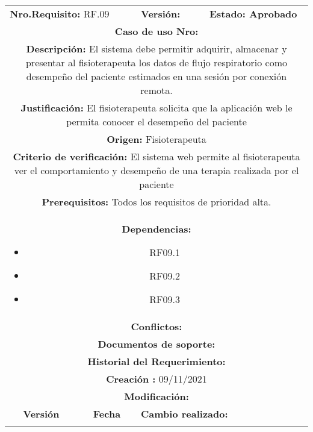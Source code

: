 \begin{center}
\begin{tabular}{|c|c|p{4cm}|p{4cm}|}
            \hline
            \rowcolor{red} \multicolumn{4}{|c|}{\textbf{Prioridad:} Alta}  \\
            \hline
            \multicolumn{2}{|l}{\textbf{Nro.Requisito: }RF.09} & \multicolumn{1}{|l}{\textbf{Versión: }} & \multicolumn{1}{|l|}{\textbf{Estado: Aprobado}} \\
            \multicolumn{4}{|p{13cm}|}{\textbf{Caso de uso Nro: }}  \\
            \hline
            \multicolumn{4}{|p{13cm}|}{\textbf{Descripción: } El sistema debe permitir adquirir, almacenar y presentar al fisioterapeuta los datos de flujo respiratorio como desempeño del paciente estimados en una sesión por conexión remota. } \\
            \multicolumn{4}{|p{13cm}|}{\textbf{Justificación: } El fisioterapeuta solicita que la aplicación web le permita conocer el desempeño del paciente} \\ 
            \multicolumn{4}{|p{13cm}|}{\textbf{Origen: }Fisioterapeuta}  \\
            \multicolumn{4}{|p{13cm}|}{\textbf{Criterio de verificación: } El sistema web permite al fisioterapeuta ver el comportamiento y desempeño de una terapia realizada por el paciente} \\
            \hline
            \multicolumn{4}{|p{13cm}|}{\textbf{Prerequisitos: } Todos los requisitos de prioridad alta. }\\
            \hline \multicolumn{4}{|p{12cm}|}{\textbf{Dependencias: }
               \begin{itemize}
                   \item RF09.1
                   \item RF09.2
                   \item RF09.3
               \end{itemize}
              }  \\
            \multicolumn{4}{|p{12cm}|}{\textbf{Conflictos: }}  \\
            \hline
            \multicolumn{4}{|p{12cm}|}{\textbf{Documentos de soporte: }}  \\
            \hline
            \multicolumn{4}{|p{12cm}|}{\textbf{Historial del Requerimiento: }}  \\
            \multicolumn{4}{|p{12cm}|}{\textbf{Creación : }09/11/2021}  \\
            \multicolumn{4}{|p{12cm}|}{\textbf{Modificación: }}  \\
             \textbf{Versión} & \textbf{Fecha} & \multicolumn{2}{p{8cm}|}{\textbf{Cambio realizado:}} \\
            \hline
                 & &   \multicolumn{2}{p{8cm}|}{}
              \\
            \hline
\end{tabular}




\end{center}
